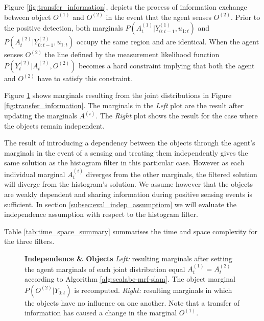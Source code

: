 Figure \ref{fig:transfer_information}, depicts the process of information exchange between object $O^{(1)}$ and $O^{(2)}$ in the event that the agent 
senses $O^{(2)}$. Prior to the positive detection, both marginals $P(A^{(1)}_t|Y^{(1)}_{0:t-1},u_{1:t})$ and $P(A^{(2)}_t|Y^{(2)}_{0:t-1},u_{1:t})$ 
occupy the same region and are identical. When the agent senses $O^{(2)}$ the line defined by the measurement 
likelihood function $P(Y^{(2)}_t|A^{(2)}_t,O^{(2)})$ becomes a hard constraint implying that both the agent and $O^{(2)}$ have to satisfy this constraint.

Figure \ref{fig:independence_object} shows marginals resulting from the joint distributions in Figure \ref{fig:transfer_information}. The marginals in
the \textit{Left} plot are the result after updating the marginals $A^{(i)}$. The \textit{Right} plot shows the result for the case where the objects
remain independent. 

The result of introducing a dependency between the objects through the agent's marginals in the event of a sensing and treating them
independently gives the same solution as the histogram filter in this particular case. However as each individual marginal $A^{(i)}_t$ diverges 
from the other marginals, the filtered solution will diverge from the histogram's solution. We assume however that the objects are weakly 
dependent and sharing information during positive sensing events is sufficient. In section \ref{subsec:eval_indep_assumptiom} we will 
evaluate the independence assumption with respect to the histogram filter.

Table \ref{tab:time_space_summary} summarises the time and space complexity for the three filters.%

\begin{figure}
  \centering
  \caption{\textbf{Independence \& Objects} \textit{Left:} resulting marginals after setting the agent marginals of each 
  joint distribution equal $A^{(1)}_t = A^{(2)}_t$ according to Algorithm \ref{alg:scalabe-mrf-slam}. The object marginal $P(O^{(2)}|Y_{0:t})$ is recomputed. 
  \textit{Right:} resulting marginals in which the objects have no influence on one another.
  Note that a transfer of information has caused a change in the marginal $O^{(1)}$.}
  \label{fig:independence_object}
\end{figure}


